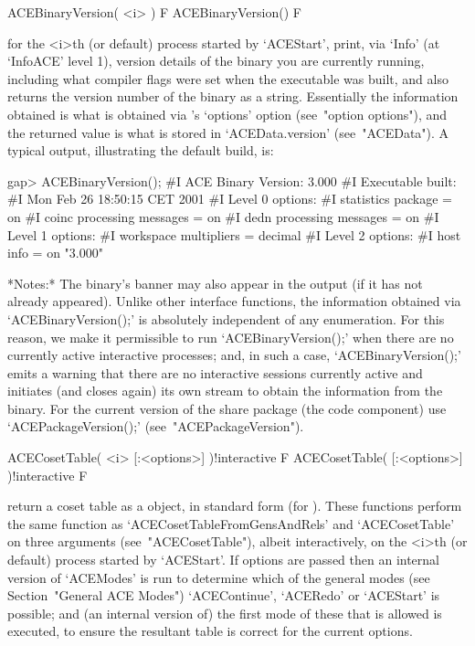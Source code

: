 \>ACEBinaryVersion( <i> ) F
\>ACEBinaryVersion() F

for the <i>th (or default) process started by `ACEStart',  print,  via
`Info' (at `InfoACE' level 1), version details of  the  {\ACE}  binary
you are currently running, including what compiler flags were set when
the executable was built, and also returns the version number  of  the
binary as a string. Essentially the information obtained  is  what  is
obtained via {\ACE}'s `options' option (see~"option options"), and the
returned value is what is stored in `ACEData.version' (see~"ACEData").
A typical output, illustrating the default build, is:

\beginexample
gap> ACEBinaryVersion();       
#I  ACE Binary Version: 3.000
#I  Executable built:
#I    Mon Feb 26 18:50:15 CET 2001
#I  Level 0 options:
#I    statistics package = on
#I    coinc processing messages = on
#I    dedn processing messages = on
#I  Level 1 options:
#I    workspace multipliers = decimal
#I  Level 2 options:
#I    host info = on
"3.000"
\endexample

*Notes:*
The {\ACE} binary's banner may also appear in the output  (if  it  has
not already appeared). Unlike other {\ACE}  interface  functions,  the
information   obtained   via   `ACEBinaryVersion();'   is   absolutely
independent  of  any  enumeration.  For  this  reason,  we   make   it
permissible to run `ACEBinaryVersion();' when there are  no  currently
active  interactive  {\ACE}  processes;   and,   in   such   a   case,
`ACEBinaryVersion();' emits a warning that there  are  no  interactive
{\ACE} sessions currently active and initiates (and closes again)  its
own stream to obtain the information from the {\ACE} binary.  For  the
current  version  of  the  {\ACE}  share  package  (the  {\GAP}   code
component) use `ACEPackageVersion();' (see~"ACEPackageVersion").


\>ACECosetTable( <i> [:<options>] )!{interactive} F
\>ACECosetTable( [:<options>] )!{interactive} F

return a coset table  as  a  {\GAP}  object,  in  standard  form  (for
{\GAP}).   These   functions   perform   the    same    function    as
`ACECosetTableFromGensAndRels' and `ACECosetTable' on three  arguments
(see~"ACECosetTable"), albeit interactively, on the <i>th (or default)
process started by `ACEStart'. If options are passed then an  internal
version of `ACEModes' is run to determine which of the general  {\ACE}
modes (see Section~"General ACE Modes")  `ACEContinue',  `ACERedo'  or
`ACEStart' is possible; and (an internal version of) the first mode of
these that is allowed is executed, to ensure the  resultant  table  is
correct for the current options.

